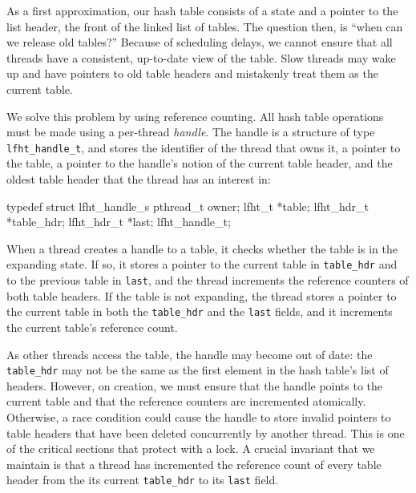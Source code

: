 
As a first approximation, our hash table consists of a state and a
pointer to the list header, the front of the linked list of tables.
The question then, is ``when can we release old tables?'' Because of
scheduling delays, we cannot ensure that all threads have a
consistent, up-to-date view of the table. Slow threads may wake up and
have pointers to old table headers and mistakenly treat them as the
current table.

We solve this problem by using reference counting.  All hash table
operations must be made using a per-thread {\em handle\/}. The handle
is a structure of type \texttt{lfht\_handle\_t}, and stores the
identifier of the thread that owns it, a pointer to the table, a
pointer to the handle's notion of the current table header, and the
oldest table header that the thread has an interest in:
\begin{center}
\begin{clisting}
typedef struct lfht_handle_s {
  pthread_t owner;
  lfht_t *table;
  lfht_hdr_t *table_hdr;
  lfht_hdr_t *last;  
} lfht_handle_t;
\end{clisting}
\end{center}

When a thread creates a handle to a table, it checks whether the table
is in the expanding state. If so, it stores a pointer to the current
table in \texttt{table\_hdr} and to the previous table in
\texttt{last}, and the thread increments the reference counters of
both table headers. If the table is not expanding, the thread stores a
pointer to the current table in both the \texttt{table\_hdr} and the
\texttt{last} fields, and it increments the current table's reference count.

As other threads access the table, the handle may become out of date:
the \texttt{table\_hdr} may not be the same as the first element in
the hash table's list of headers. However, on creation, we must ensure
that the handle points to the current table and that the reference
counters are incremented atomically. Otherwise, a race condition could
cause the handle to store invalid pointers to table headers that have
been deleted concurrently by another thread. This is one of the
critical sections that protect with a lock. A crucial invariant that
we maintain is that a thread has incremented the reference count of
every table header from the its current \texttt{table\_hdr} to its
\texttt{last} field.

